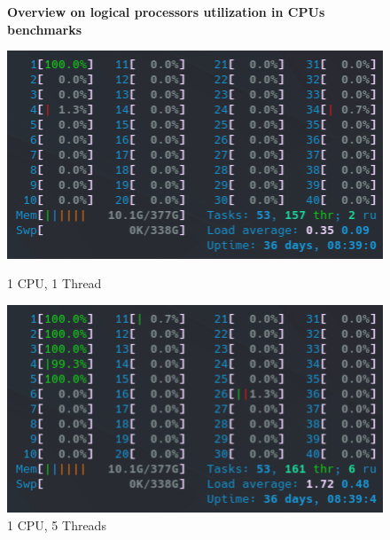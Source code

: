 \begin{figure}[!h]
    \caption*{\textbf{Overview on logical processors utilization in CPUs benchmarks}}
    \centering
    \captionsetup{width=.48\linewidth}
    \begin{minipage}[t]{0.48\textwidth}
        \includegraphics[width=\textwidth]{figures/configurations/OMP/htop_cpus/1CPU_1Thread.png}
        \caption{1 CPU, 1 Thread}\label{fig:1CPU_1Thread}
    \end{minipage}
    \hspace{0.4cm}
    \centering
    \captionsetup{width=.48\linewidth}
    \begin{minipage}[t]{0.48\textwidth}
        \includegraphics[width=\textwidth]{figures/configurations/OMP/htop_cpus/1CPU_5Threads.png}
        \caption{1 CPU, 5 Threads}\label{fig:1CPU_5Threads}
    \end{minipage}


\end{figure}
